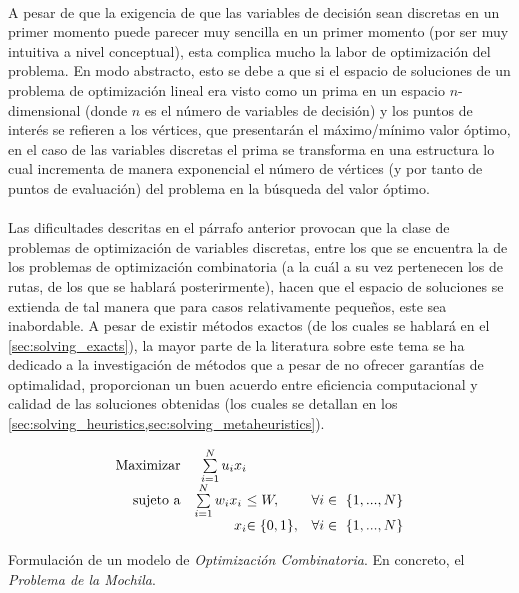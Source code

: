 \documentclass{subfiles}
\begin{document}
        \paragraph{}
        A pesar de que la exigencia de que las variables de decisión sean discretas en un primer momento puede parecer muy sencilla en un primer momento (por ser muy intuitiva a nivel conceptual), esta complica mucho la labor de optimización del problema. En modo abstracto, esto se debe a que si el espacio de soluciones de un problema de optimización lineal era visto como un prima en un espacio $n$-dimensional (donde $n$ es el número de variables de decisión) y los puntos de interés se refieren a los vértices, que presentarán el máximo/mínimo valor óptimo, en el caso de las variables discretas el prima se transforma en una estructura  lo cual incrementa de manera exponencial el número de vértices (y por tanto de puntos de evaluación) del problema en la búsqueda del valor óptimo.

        \paragraph{}
        Las dificultades descritas en el párrafo anterior provocan que la clase de problemas de optimización de variables discretas, entre los que se encuentra la de los problemas de optimización combinatoria (a la cuál a su vez pertenecen los de rutas, de los que se hablará posterirmente), hacen que el espacio de soluciones se extienda de tal manera que para casos relativamente pequeños, este sea inabordable. A pesar de existir métodos exactos (de los cuales se hablará en el \cref{sec:solving_exacts}), la mayor parte de la literatura sobre este tema se ha dedicado a la investigación de métodos que a pesar de no ofrecer garantías de optimalidad, proporcionan un buen acuerdo entre eficiencia computacional y calidad de las soluciones obtenidas (los cuales se detallan en los \cref{sec:solving_heuristics,sec:solving_metaheuristics}).

        \begin{eqfloat}
          \begin{equation}
            \begin{array}{rr@{}ll}
              \text{Maximizar} & \sum\limits_{i = 1}^{N} u_{i}x_{i} &                 & \\
              \text{sujeto a}	 & \sum\limits_{i = 1}^{N} w_{i}x_{i} \ &\leq W, & \forall i \in \{1,...,N\} \\
                               &                             	x_{i} 	&\in \{0, 1\}, 	                 & \forall i \in \{1,...,N\}
            \end{array}
          \end{equation}
          \caption{Formulación de un modelo de \emph{Optimización Combinatoria}. En concreto, el \emph{Problema de la Mochila}.}
          \label{eq:combinatorial_optimization_formulation}
        \end{eqfloat}
\end{document}
